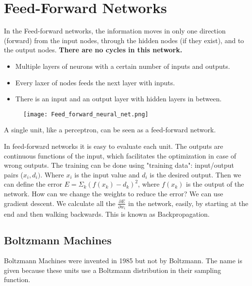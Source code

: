 \documentclass[main]{subfiles}
\begin{document}

\section{Feed-Forward Networks}

In the Feed-forward networks, the information moves in only one direction (forward) from the input nodes, through the hidden nodes (if they exist), and to the output nodes.
\textbf{There are no cycles in this network.}
\begin{itemize}[noitemsep,nolistsep]
	\item Multiple layers of neurons with a certain number of inputs and outputs.
	\item Every laxer of nodes feeds the next layer with inputs.
	\item There is an input and an output layer with hidden layers in between.
\end{itemize}

\begin{figure}[H]
	\centering
	\texttt{[image: Feed\_forward\_neural\_net.png]}
\end{figure}

A single unit, like a perceptron, can be seen as a feed-forward network.

In feed-forward networks it is easy to evaluate each unit.
The outputs are continuous functions of the input, which facilitates the optimization in case of wrong outputs.
The training can be done using "training data": input/output pairs ($x_i, d_i)$. Where $x_i$ is the input value and $d_i$ is the desired output.
Then we can define the error $E = \Sigma_k (f(x_k) - d_k)^2$, where $f(x_k)$ is the output of the network.
How can we change the weights to reduce the error?
We can use gradient descent.
We calculate all the $\frac{\partial E}{\partial w_i}$ in the network, easily, by starting at the end and then walking backwards. This is known as Backpropagation.

\subsection{Boltzmann Machines}

Boltzmann Machines were invented in 1985 but not by Boltzmann.
The name is given because these units use a Boltzmann distribution in their sampling function.
\end{document}
